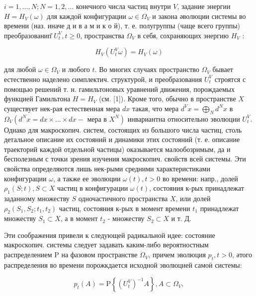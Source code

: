 \documentclass[10pt]{article}
\begin{document}
$i=1, \ldots, N ; N=1,2, \ldots$ конечного числа частиц внутри $V$, задание энергии $H=H_{V}(\omega)$ для каждой конфигурации $\omega \in \Omega_{V}$ и закона әволюции системы во времени (наз. иначе д и в а м и к о й), т. е. полугруппы (чаще всего группы) преобразованип̆ $U_{t}^{V}, t \geqslant 0$, пространства $\Omega_{V}$ в себя, сохраняющих энергию $H_{V}$ :



\[

H_{V}\left(U_{t}^{V} \omega\right)=H_{V}(\omega)

\]



для любой $\omega \in \Omega_{V}$ и любого $t$. Во многих случаях пространство $\Omega_{V}$ бывает естественно наделено симплектич. структурой, и преобразования $U_{t}^{V}$ строятся с помощью решений т. н. гамильтоновых уравнений движения, порождаемых функцией Гамильтона $H=H_{V}$ (см. [1]). Кроме того, обычно в пространстве $X$ существует нек-рая естественная мера $d x$ такая, что мера $d^{V} x=\bigoplus_{N} d^{N} x$ в $\Omega_{V}\left(d^{N} x=d x \times \ldots \times d x-\right.$ мера в $\left.X^{N}\right)$ инвариантна относительно эволюции $U_{t}^{V}$. Однако для макроскопич. систем, состоящих из большого числа частиц, столь детальное описание их состояний и динамики этих состояний (т. е. описание траекторий каждой отдельной частицы) оказывается малообозримым, да и бесполезным с точки зрения изучения макроскопич. свойств всей системы. Эти свойства определяются лишь нек-рыми средними характеристиками конфигурации $\omega$, а также ее эволюции $\omega(t), t>0$ во времени: напр., долей $\rho_{1}(S ; t), S \subset X$ частиц в конфигурации $\omega(t)$, состояния к-рых принадлежат заданному множеству $S$ одночастичного пространства $X$, или долей $\rho_{2}\left(S_{1}, S_{2} ; t_{1}, t_{2}\right)$ частиц, состояния к-рых в момент времени $t_{1}$ принадлежат множеству $S_{1} \subset X$, а в момент $t_{2}$ - множеству $S_{2} \subset X$ и т. Д.



Эти соображения привели к следующей радикальной идее: состояние макроскопич. системы следует задавать каким-либо вероятностным распределением $\mathrm{P}$ на фазовом пространстве $\Omega_{V}$, причем эволюция $p_{t}, t>0$, әтого распределения во времени порожкдается исходной эволюцией самоӥ системы:



\[

p_{t}(A)=\mathrm{P}\left\{\left(U_{t}^{V}\right)^{-1} A\right\}, A \subset \Omega_{V},

\]
\end{document}
